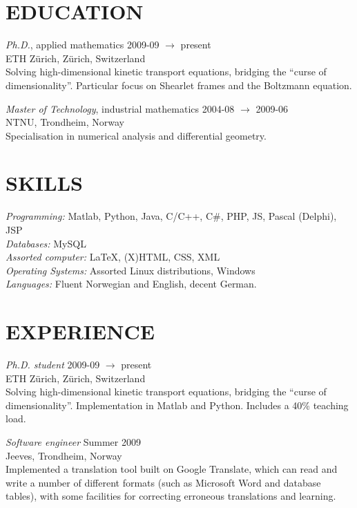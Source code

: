 \documentclass[line,margin]{res}
\newcommand{\zh}{Z\"{u}rich}
\begin{document}
\address{Forchstrasse 168, CH-8032 \zh}
\address{+41 78 634 68 37}


\begin{resume}

\section{EDUCATION} 
    {\em Ph.D.}, applied mathematics \hfill 2009-09 $\to$ present \\
    ETH \zh, \zh, Switzerland \\
    Solving high-dimensional kinetic transport equations, bridging the ``curse
    of dimensionality''. Particular focus on Shearlet frames and the Boltzmann
    equation.

    {\em Master of Technology}, industrial mathematics \hfill 2004-08 $\to$ 2009-06 \\
    NTNU, Trondheim, Norway \\
    Specialisation in numerical analysis and differential geometry.


\section{SKILLS}
    {\em Programming:} Matlab, Python, Java, C/C++, C\#, PHP, JS, 
        Pascal (Delphi), JSP \\
    {\em Databases:} MySQL \\
    {\em Assorted computer:} \LaTeX, (X)HTML, CSS, XML \\
    {\em Operating Systems:} Assorted Linux distributions, Windows \\
    {\em Languages:} Fluent Norwegian and English, decent German.


\section{EXPERIENCE} 
    {\em Ph.D. student} \hfill 2009-09 $\to$ present \\
    ETH \zh, \zh, Switzerland \\
    Solving high-dimensional kinetic transport equations, bridging the ``curse
    of dimensionality''.  Implementation in Matlab and Python. Includes a 40\%
    teaching load.

    {\em Software engineer} \hfill Summer 2009 \\
    Jeeves, Trondheim, Norway \\
    Implemented a translation tool built on Google Translate, which can read and
    write a number of different formats (such as Microsoft Word and database
    tables), with some facilities for correcting erroneous translations and
    learning.


\end{resume}
\end{document}
